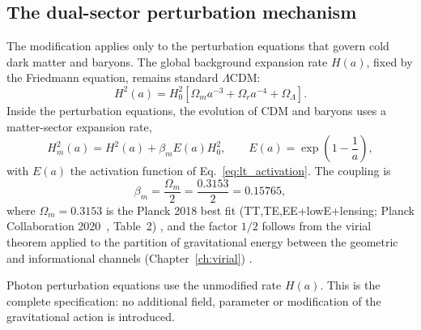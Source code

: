 \subsection{The dual-sector perturbation mechanism}
The modification applies only to the perturbation equations that govern cold dark matter and baryons. The global background expansion rate $H(a)$,
fixed by the Friedmann equation, remains standard $\Lambda$CDM:
\begin{equation}
H^2(a)=H_0^2\left[\Omega_ma^{-3}+\Omega_ra^{-4}+\Omega_\Lambda\right].
\label{eq:l2_friedmann}\end{equation}
Inside the perturbation equations, the evolution of CDM and baryons uses a matter-sector expansion rate,
\begin{equation}
H_m^2(a)=H^2(a)+\beta_mE(a)H_0^2,\qquad E(a)=\exp\!\left(1-\frac1a\right),
\label{eq:l2_Hm}\end{equation}
with $E(a)$ the activation function of Eq.~\eqref{eq:lt_activation}. The coupling is
\begin{equation}
\beta_m=\frac{\Omega_m}{2}=\frac{0.3153}{2}=0.15765,
\label{eq:l2_beta}\end{equation}
where $\Omega_m=0.3153$ is the Planck 2018 best fit (TT,TE,EE+lowE+lensing; Planck Collaboration 2020~\cite{Planck2018VI}, Table~2) \measured, and the
factor $1/2$ follows from the virial theorem applied to the partition of gravitational energy between the geometric and informational channels
(Chapter~\ref{ch:virial}) \derived.

Photon perturbation equations use the unmodified rate $H(a)$. This is the complete specification: no additional field, parameter or modification of
the gravitational action is introduced.

